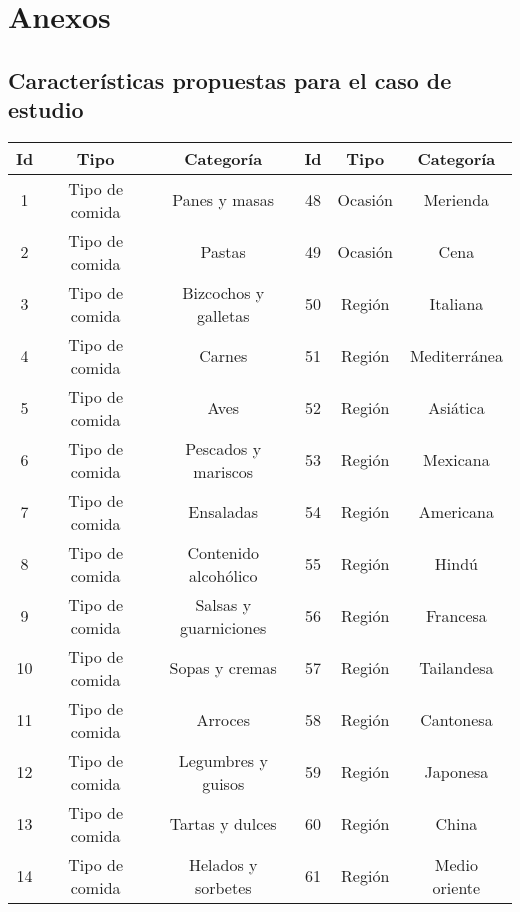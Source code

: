 \newpage
\chapter{Anexos}
\section{Características propuestas para el caso de estudio}
  \begin{table}[h]
    \begin{center}
      \begin{tabular}{ | c | c | c | c | c | c |}
        \toprule
        Id & Tipo & Categoría & Id & Tipo & Categoría\\
        \midrule
        1 & Tipo de comida & Panes y masas  & 48 & Ocasión   & Merienda \\
        \midrule
        2 & Tipo de comida & Pastas  & 49 & Ocasión   & Cena \\
        \midrule
        3 & Tipo de comida & Bizcochos y galletas  & 50 & Región   & Italiana \\
        \midrule
        4 & Tipo de comida & Carnes  & 51 & Región   & Mediterránea \\
        \midrule
        5 & Tipo de comida & Aves  & 52 & Región   & Asiática \\
        \midrule
        6 & Tipo de comida & Pescados y mariscos  & 53 & Región   & Mexicana \\
        \midrule
        7 & Tipo de comida & Ensaladas  & 54 & Región   & Americana \\
        \midrule
        8 & Tipo de comida & Contenido alcohólico  & 55 & Región   & Hindú \\
        \midrule
        9 & Tipo de comida & Salsas y guarniciones  & 56 & Región   & Francesa \\
        \midrule
        10 & Tipo de comida & Sopas y cremas  & 57 & Región   & Tailandesa \\
        \midrule
        11 & Tipo de comida & Arroces  & 58 & Región   & Cantonesa \\
        \midrule
        12 & Tipo de comida & Legumbres y guisos  & 59 & Región   & Japonesa \\
        \midrule
        13 & Tipo de comida & Tartas y dulces  & 60 & Región   & China \\
        \midrule
        14 & Tipo de comida & Helados y sorbetes  & 61 & Región   & Medio oriente \\

\end{tabular}
\end{center}
\end{table}
